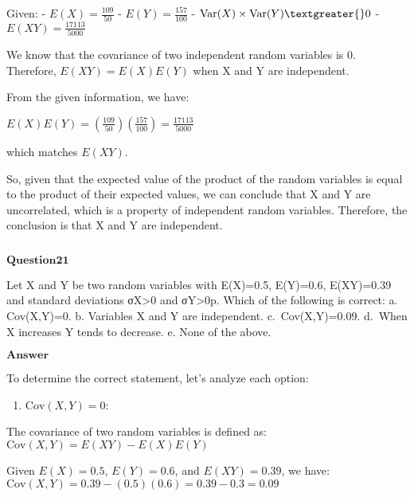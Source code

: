 \documentclass[11pt]{article}
\makeatletter
\providecommand{\tightlist}{%
      \setlength{\itemsep}{0pt}\setlength{\parskip}{0pt}}
\newcommand{\boxspacing}{\kern\kvtcb@left@rule\kern\kvtcb@boxsep}
\newcommand{\prompt}[4]{
        {\ttfamily\llap{{\color{#2}[#3]:\hspace{3pt}#4}}\vspace{-\baselineskip}}
    }
\makeatother
\begin{document}
Given: - $ E(X) = \frac{109}{50} $ - $ E(Y) = \frac{157}{100} $ - $
\text{Var}(X) \times \text{Var}(Y) \textgreater{} 0 $ - $ E(XY) =
\frac{17113}{5000} $

We know that the covariance of two independent random variables is 0.
Therefore, $ E(XY) = E(X)E(Y) $ when X and Y are independent.

From the given information, we have:

$ E(X)E(Y) = \left(\frac{109}{50}\right) \left(\frac{157}{100}\right) =
\frac{17113}{5000} $

which matches $ E(XY) $.

So, given that the expected value of the product of the random variables
is equal to the product of their expected values, we can conclude that X
and Y are uncorrelated, which is a property of independent random
variables. Therefore, the conclusion is that X and Y are independent.

    \begin{tcolorbox}[breakable, size=fbox, boxrule=1pt, pad at break*=1mm,colback=cellbackground, colframe=cellborder]
\prompt{In}{incolor}{ }{\boxspacing}
\begin{Verbatim}[commandchars=\\\{\}]

\end{Verbatim}
\end{tcolorbox}

    $\textbf{Question21}$

Let X and Y be two random variables with E(X)=0.5, E(Y)=0.6, E(XY)=0.39
and standard deviations σX\textgreater0 and σY\textgreater0p. Which of
the following is correct: a. Cov(X,Y)=0. b. Variables X and Y are
independent. c.~Cov(X,Y)=0.09. d.~When X increases Y tends to decrease.
e. None of the above.

$\textbf{Answer}$

    To determine the correct statement, let's analyze each option:

\begin{enumerate}
\def\labelenumi{\alph{enumi}.}
\tightlist
\item
  $ \text{Cov}(X,Y) = 0 $:
\end{enumerate}

The covariance of two random variables is defined as: $ \text{Cov}(X,Y)
= E(XY) - E(X)E(Y) $

Given $ E(X) = 0.5 $, $ E(Y) = 0.6 $, and $ E(XY) = 0.39 $, we
have: $ \text{Cov}(X,Y) = 0.39 - (0.5)(0.6) = 0.39 - 0.3 = 0.09 $
\end{document}
